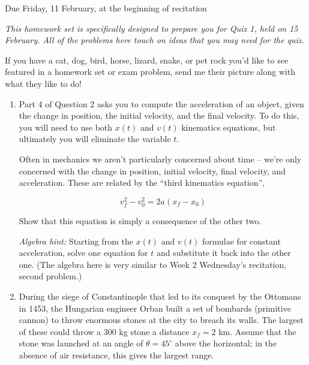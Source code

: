 \documentclass[12pt]{article}
\begin{document}
\Large
\centerline{}


\begin{center} \normalsize Due Friday, 11 February, at the beginning of recitation
\end{center}
\normalsize

\it This homework set is specifically designed to prepare you for Quiz 1, held on 15 February. All of the problems here touch on ideas that you may need for the quiz. 

If you have a cat, dog, bird, horse, lizard, snake, or pet rock you'd like to see featured in a homework set or exam problem, send me their picture along with what they like to do!

\rm
\begin{enumerate}

\item Part 4 of Question 2 asks you to compute the acceleration of an object, given the change in position, the initial velocity, and the final velocity. To do this, you will need to use both $x(t)$ and $v(t)$ kinematics equations, but ultimately you will eliminate the variable $t$.

Often in mechanics we aren't particularly concerned about time -- we're only concerned with the change in position, initial velocity, final velocity, and acceleration.
These are related by the ``third kinematics equation'', 

$$
v_f^2 - v_0^2 = 2a(x_f - x_0)
$$

Show that this equation is simply a consequence of the other two.

{\it Algebra hint:} Starting from the $x(t)$ and $v(t)$ formulae for constant acceleration, solve one equation for $t$ and substitute it back into the other one. (The algebra here is very similar to Week 2 Wednesday's recitation, second problem.)

\bigskip

\item During the siege of Constantinople that led to its conquest by the Ottomans in 1453, the Hungarian engineer Orban built a set of bombards (primitive cannon) to throw enormous stones at the city to breach its walls. The largest of these could throw a 300 kg stone a distance $x_f=2$ km. Assume that the stone was launched at an angle of $\theta=45^\circ$ above the horizontal; in the absence of air resistance, this gives the largest range.

\begin{enumerate}


\end{enumerate}
\end{enumerate}
\end{document}
